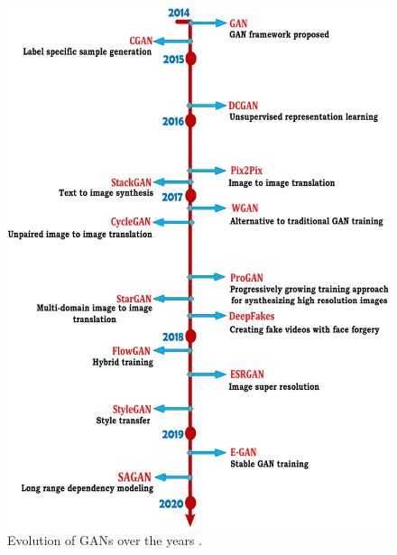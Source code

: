 \begin{figure}
        \begin{center}
 	    \includegraphics[scale=0.25]{images/relatedWorks/GANEvolution.jpg}
	    \caption[Evolution of \acp{GAN} Over the Years.]{Evolution of \acp{GAN} over the years \cite{PavanKumar.2021}.}
	    \label{fig:GANEvolution}
	    \end{center}
\end{figure}




